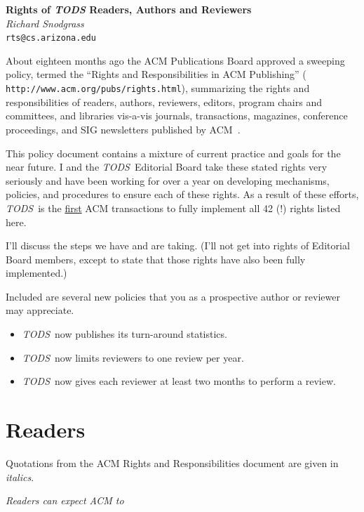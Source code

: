 \documentclass{article}
\newcommand{\tods}{{\em TODS\/}}
\begin{document}
\begin{center}
{\Large\bf Rights of {\em TODS} Readers, Authors and Reviewers}\\[2ex]
{\large\it  Richard Snodgrass}\\[1ex]
{\tt rts@cs.arizona.edu}\\[3ex]
\end{center}

About eighteen months ago the ACM Publications Board approved a sweeping
policy, termed the ``Rights and Responsibilities in ACM Publishing'' ({\tt
http://www.acm.org/pubs/rights.html}), summarizing the rights and
responsibilities of readers, authors, reviewers, editors, program chairs and
committees, and libraries vis-a-vis journals, transactions, magazines,
conference proceedings, and SIG newsletters published by ACM~\cite{SN02}.

This policy document contains a mixture of current practice and goals for the near
future. I and the \tods\ Editorial Board take these stated rights very
seriously and have been working for over a year on developing mechanisms,
policies, and procedures to ensure each of these rights. As a result of
these efforts, \tods\ is the \underline{first} ACM transactions to fully
implement all 42 (!) rights listed here.

I'll discuss the steps we have and are taking. (I'll not get into
rights of Editorial Board members, except to state that those rights have
also been fully implemented.)

Included are several new policies that you as a prospective author or reviewer may
appreciate.
\begin{itemize}
\item \tods\ now publishes its turn-around statistics.
\item \tods\ now limits reviewers to one review per year.
\item \tods\ now gives each reviewer at least two months to perform a review.
\end{itemize}

\section{Readers}

\noindent
Quotations from the ACM Rights and Responsibilities document are given in {\em italics}.

\vspace{2ex}

\noindent
{\em Readers can expect ACM to}
\end{document}
